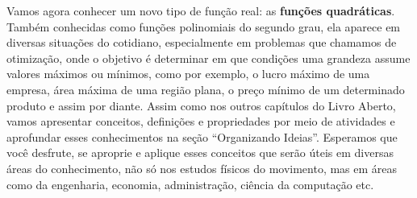 \mainmatter

Vamos agora conhecer um novo tipo de função real: as \textbf{funções quadráticas}. Também conhecidas como funções polinomiais do segundo grau, ela aparece em diversas situações do cotidiano, especialmente em problemas que chamamos de otimização, onde o objetivo é determinar em que condições uma grandeza assume valores máximos ou mínimos, como por exemplo, o lucro máximo de uma empresa, área máxima de uma região plana, o preço mínimo de um determinado produto e assim por diante. Assim como nos outros capítulos do Livro Aberto, vamos apresentar conceitos, definições e propriedades por meio de atividades e aprofundar esses conhecimentos na seção “Organizando Ideias”. Esperamos que você desfrute, se aproprie e aplique esses conceitos que serão úteis em diversas áreas do conhecimento, não só nos estudos físicos do movimento, mas em áreas como da engenharia, economia, administração, ciência da computação etc.


